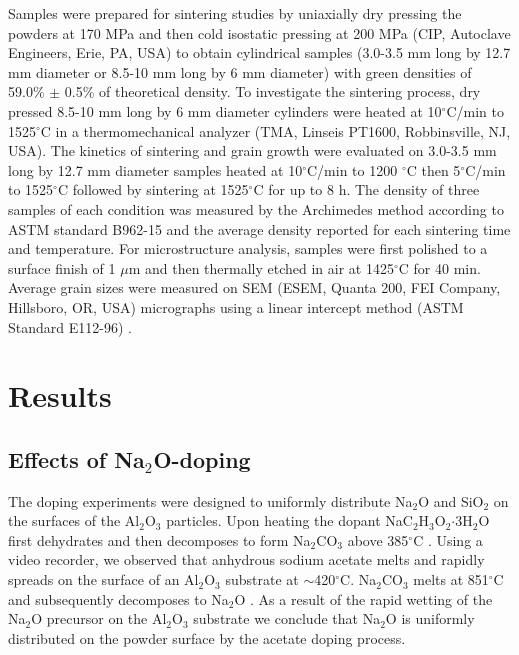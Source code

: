 Samples were prepared for sintering studies by uniaxially dry pressing the powders at 170 MPa and then cold isostatic pressing at 200 MPa (CIP, Autoclave Engineers, Erie, PA, USA) to obtain cylindrical samples (3.0-3.5 mm long by 12.7 mm diameter or 8.5-10 mm long by 6 mm diameter) with green densities of 59.0\% $\pm$ 0.5\% of theoretical density. To investigate the sintering process, dry pressed 8.5-10 mm long by 6 mm diameter cylinders were heated at 10$^{\circ}$C/min to 1525$^{\circ}$C in a thermomechanical analyzer (TMA, Linseis PT1600, Robbinsville, NJ, USA). The kinetics of sintering and grain growth were evaluated on 3.0-3.5 mm long by 12.7 mm diameter samples heated at 10$^{\circ}$C/min to 1200 $^{\circ}$C then 5$^{\circ}$C/min to 1525$^{\circ}$C followed by sintering at 1525$^{\circ}$C for up to 8 h. The density of three samples of each condition was measured by the Archimedes method according to ASTM standard B962-15 \cite{Standard2015} and the average density reported for each sintering time and temperature. For microstructure analysis, samples were first polished to a surface finish of 1 $\mu$m and then thermally etched in air at 1425$^{\circ}$C for 40 min. Average grain sizes were measured on SEM (ESEM, Quanta 200, FEI Company, Hillsboro, OR, USA) micrographs using a linear intercept method (ASTM Standard E112-96) \cite{Standard2013}.

\section{Results}

\subsection{Effects of Na$_{2}$O-doping}

The doping experiments were designed to uniformly distribute Na$_{2}$O and SiO$_{2}$ on the surfaces of the Al$_{2}$O$_{3}$ particles. Upon heating the dopant NaC$_{2}$H$_{3}$O$_{2}$$\cdot$3H$_{2}$O first dehydrates and then decomposes to form Na$_{2}$CO$_{3}$ above 385$^{\circ}$C \cite{Judd1974}. Using a video recorder, we observed that anhydrous sodium acetate melts and rapidly spreads on the surface of an Al$_{2}$O$_{3}$ substrate at $\sim$420$^{\circ}$C. Na$_{2}$CO$_{3}$ melts at 851$^{\circ}$C and subsequently decomposes to Na$_{2}$O \cite{Judd1974}. As a result of the rapid wetting of the Na$_{2}$O precursor on the Al$_{2}$O$_{3}$ substrate we conclude that Na$_{2}$O is uniformly distributed on the powder surface by the acetate doping process. 

